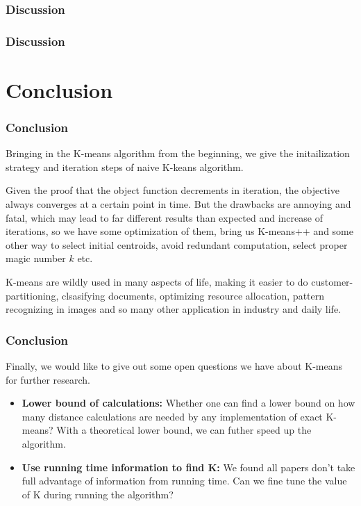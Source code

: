 \documentclass[9pt]{beamer}
\begin{document}
\begin{frame}
	\frametitle{Discussion}

\end{frame}

\begin{frame}
	\frametitle{Discussion}

\end{frame}

\section{Conclusion}
\begin{frame}
	\frametitle{Conclusion}
	Bringing in the K-means algorithm from the beginning, we give the initailization strategy and iteration steps of naive K-keans algorithm.
	\par Given the proof that the object function decrements in iteration, the objective always converges at a certain point in time. But the drawbacks are annoying and fatal, which may lead to far different results than expected and increase of iterations, so we have some optimization of them, bring us K-means++ and some other way to select initial centroids, avoid redundant computation, select proper magic number $k$ etc.
	\par K-means are wildly used in many aspects of life, making it easier to do customer-partitioning, clsasifying documents, optimizing resource allocation, pattern recognizing in images and so many other application in industry and daily life.
\end{frame}

\begin{frame}
	\frametitle{Conclusion}
	Finally, we would like to give out some open questions we have about K-means for further research.
	\begin{itemize}
	\item \textbf{Lower bound of calculations:} Whether one can find a lower bound on how many distance calculations are needed by any implementation of exact K-means? With a theoretical lower bound, we can futher speed up the algorithm.
	\item \textbf{Use running time information to find K:} We found all papers don't take full advantage of information from running time. Can we fine tune the value of K during running the algorithm?
	\end{itemize}
\end{frame}
\end{document}
